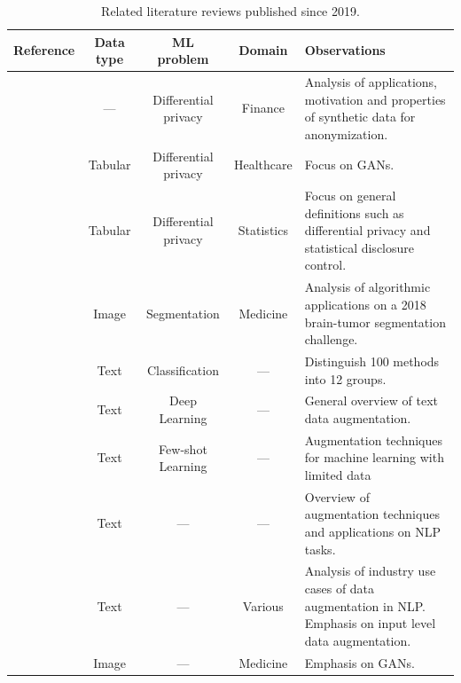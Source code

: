 \documentclass[parskip=full]{scrartcl}
\begin{document}
\begin{table}[t!]
    \centering
    \caption{\label{tab:literature-reviews}
        Related literature reviews published since 2019.
    }
    \small{
    \begin{tabularx}{\textwidth}{@{}rcccX@{}}
        \toprule
        Reference & Data type & ML problem & Domain & Observations \\
        \midrule

        \citet{assefa2020generating} & --- & Differential privacy &
        Finance & Analysis of applications, motivation and properties of
        synthetic data for anonymization. \\

        \citet{hernandez2022synthetic} & Tabular & Differential privacy &
        Healthcare & Focus on GANs. \\

        \citet{raghunathan2021synthetic} & Tabular & Differential privacy &
        Statistics & Focus on general definitions such as differential privacy
        and statistical disclosure control.\\

        \citet{nalepa2019data} & Image & Segmentation & Medicine & Analysis of
        algorithmic applications on a 2018 brain-tumor segmentation
        challenge.\\

        \citet{bayer2021survey} & Text & Classification & --- & Distinguish
        100 methods into 12 groups. \\

        \citet{shorten2021text} & Text & Deep Learning & --- & General
        overview of text data augmentation. \\

        \citet{chen2021empirical} & Text & Few-shot Learning & --- &
        Augmentation techniques for machine learning with limited data\\

        \citet{feng2021survey} & Text & --- & --- & Overview of augmentation
        techniques and applications on NLP tasks.\\

        \citet{liu2020survey} & Text & --- & Various & Analysis of industry
        use cases of data augmentation in NLP\@. Emphasis on input level data
        augmentation.\\

        \citet{yi2019generative} & Image & --- & Medicine & Emphasis on GANs.\\


\end{tabularx}}
\end{table}
\end{document}
